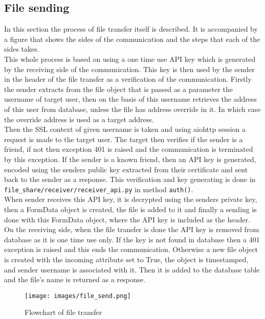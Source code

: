 \subsection{File sending}
In this section the process of file transfer itself is described. It is accompanied by a figure that shows the sides of the communication and the steps
that each of the sides takes.\\
This whole process is based on using a one time use API key which is generated by the receiving side of the communication. This key is then used by the sender in 
the header of the file transfer as a verification of the communication. 
Firstly the sender extracts from the file object that is passed as a parameter the username of target user, then on the basis of this username retrieves the
address of this user from database, unless the file has address override in it. In which case the override address is used as a target address.\\
Then the SSL context of given username is taken and using aiohttp session a request is made to the target user. The target then verifies if the sender is a friend,
if not then exception 401 is raised and the communication is terminated by this exception. If the sender is a known friend, then an API key is generated, encoded using the senders public 
key extracted from their certificate and sent back to the sender as a response. This verification and key generating is done in \texttt{file\_share/receiver/receiver\_api.py} in method \texttt{auth()}.\\
When sender receives this API key, it is decrypted using the senders private key, then a FormData object is created, the file is added to it and finally a sending
is done with this FormData object, where the API key is included as the header.\\
On the receiving side, when the file transfer is done the API key is removed from database as it is one time use only. If the key is not found in database then
a 401 exception is raised and this ends the communication. Otherwise a new file object is created with the incoming attribute set to True, the object is timestamped,
and sender username is associated with it. Then it is added to the database table and the file's name is returned as a response.\\

\begin{figure}
    \centering
    \texttt{[image: images/file\_send.png]}
    \caption{Flowchart of file transfer}
    \label{fig:filetransfer}
\end{figure}